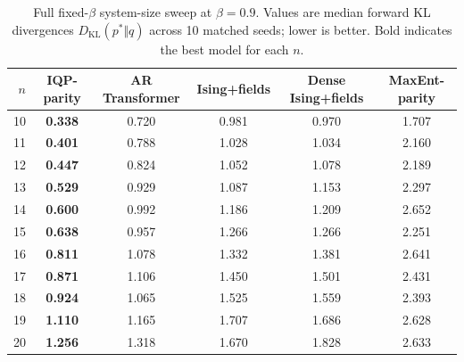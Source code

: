 \begin{table}[t]
\centering
\small
\setlength{\tabcolsep}{4.5pt}
\caption{
Full fixed-$\beta$ system-size sweep at $\beta=0.9$.
Values are median forward KL divergences $D_{\mathrm{KL}}(p^*\Vert q)$ across
10 matched seeds; lower is better. Bold indicates the best model for each $n$.
}
\label{tab:appendix_n_sweep_full}
\begin{tabular}{rccccc}
\toprule
$n$ & IQP-parity & AR Transformer & Ising+fields & Dense Ising+fields & MaxEnt-parity \\
\midrule
10 & \textbf{0.338} & 0.720 & 0.981 & 0.970 & 1.707 \\
11 & \textbf{0.401} & 0.788 & 1.028 & 1.034 & 2.160 \\
12 & \textbf{0.447} & 0.824 & 1.052 & 1.078 & 2.189 \\
13 & \textbf{0.529} & 0.929 & 1.087 & 1.153 & 2.297 \\
14 & \textbf{0.600} & 0.992 & 1.186 & 1.209 & 2.652 \\
15 & \textbf{0.638} & 0.957 & 1.266 & 1.266 & 2.251 \\
16 & \textbf{0.811} & 1.078 & 1.332 & 1.381 & 2.641 \\
17 & \textbf{0.871} & 1.106 & 1.450 & 1.501 & 2.431 \\
18 & \textbf{0.924} & 1.065 & 1.525 & 1.559 & 2.393 \\
19 & \textbf{1.110} & 1.165 & 1.707 & 1.686 & 2.628 \\
20 & \textbf{1.256} & 1.318 & 1.670 & 1.828 & 2.633 \\
\bottomrule
\end{tabular}
\end{table}
